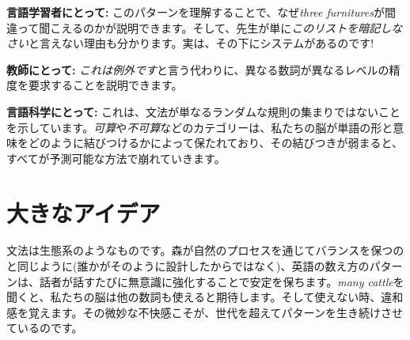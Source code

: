 \documentclass[11pt,a4paper]{article}
\begin{document}
\textbf{言語学習者にとって:} このパターンを理解することで、なぜ\textit{three furnitures}が間違って聞こえるのかが説明できます。そして、先生が単に\textit{このリストを暗記しなさい}と言えない理由も分かります。実は、その下にシステムがあるのです!

\textbf{教師にとって:} \textit{これは例外です}と言う代わりに、異なる数詞が異なるレベルの精度を要求することを説明できます。

\textbf{言語科学にとって:} これは、文法が単なるランダムな規則の集まりではないことを示しています。\textit{可算}や\textit{不可算}などのカテゴリーは、私たちの脳が単語の形と意味をどのように結びつけるかによって保たれており、その結びつきが弱まると、すべてが予測可能な方法で崩れていきます。

\section*{大きなアイデア}

文法は生態系のようなものです。森が自然のプロセスを通じてバランスを保つのと同じように(誰かがそのように設計したからではなく)、英語の数え方のパターンは、話者が話すたびに無意識に強化することで安定を保ちます。\textit{many cattle}を聞くと、私たちの脳は他の数詞も使えると期待します。そして使えない時、違和感を覚えます。その微妙な不快感こそが、世代を超えてパターンを生き続けさせているのです。
\end{document}
